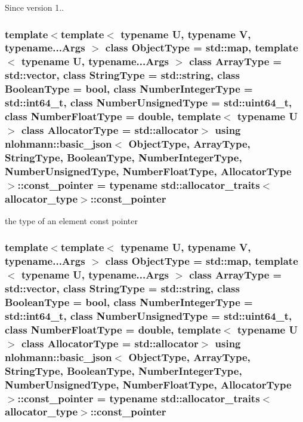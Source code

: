 \begin{DoxySince}{Since}
version 1.. 
\end{DoxySince}
\hypertarget{classnlohmann_1_1basic__json_a06efb200b69942eacd1ea22d0f6ccebb}{
\subsubsection[{const\-\_\-pointer}]{\setlength{\rightskip}{0pt plus 5cm}template$<$template$<$ typename U, typename V, typename...\-Args $>$ class Object\-Type = std\-::map, template$<$ typename U, typename...\-Args $>$ class Array\-Type = std\-::vector, class String\-Type  = std\-::string, class Boolean\-Type  = bool, class Number\-Integer\-Type  = std\-::int64\-\_\-t, class Number\-Unsigned\-Type  = std\-::uint64\-\_\-t, class Number\-Float\-Type  = double, template$<$ typename U $>$ class Allocator\-Type = std\-::allocator$>$ using {\bf nlohmann\-::basic\-\_\-json}$<$ Object\-Type, Array\-Type, String\-Type, Boolean\-Type, Number\-Integer\-Type, Number\-Unsigned\-Type, Number\-Float\-Type, Allocator\-Type $>$\-::{\bf const\-\_\-pointer} =  typename std\-::allocator\-\_\-traits$<${\bf allocator\-\_\-type}$>$\-::{\bf const\-\_\-pointer}}}\label{classnlohmann_1_1basic__json_a06efb200b69942eacd1ea22d0f6ccebb}


the type of an element const pointer 

\hypertarget{classnlohmann_1_1basic__json_a06efb200b69942eacd1ea22d0f6ccebb}{
\subsubsection[{const\-\_\-pointer}]{\setlength{\rightskip}{0pt plus 5cm}template$<$template$<$ typename U, typename V, typename...\-Args $>$ class Object\-Type = std\-::map, template$<$ typename U, typename...\-Args $>$ class Array\-Type = std\-::vector, class String\-Type  = std\-::string, class Boolean\-Type  = bool, class Number\-Integer\-Type  = std\-::int64\-\_\-t, class Number\-Unsigned\-Type  = std\-::uint64\-\_\-t, class Number\-Float\-Type  = double, template$<$ typename U $>$ class Allocator\-Type = std\-::allocator$>$ using {\bf nlohmann\-::basic\-\_\-json}$<$ Object\-Type, Array\-Type, String\-Type, Boolean\-Type, Number\-Integer\-Type, Number\-Unsigned\-Type, Number\-Float\-Type, Allocator\-Type $>$\-::{\bf const\-\_\-pointer} =  typename std\-::allocator\-\_\-traits$<${\bf allocator\-\_\-type}$>$\-::{\bf const\-\_\-pointer}}}\label{classnlohmann_1_1basic__json_a06efb200b69942eacd1ea22d0f6ccebb}


